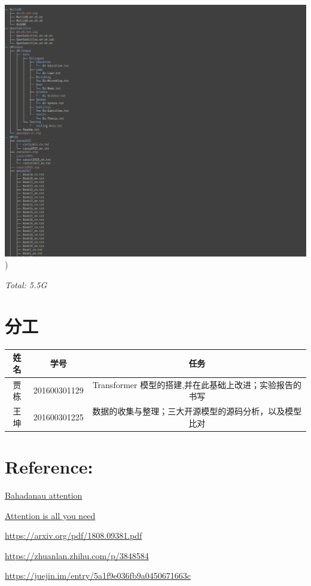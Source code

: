 \documentclass[UTF8,a4paper,10pt]{ctexart}
\begin{document}
\centerline{\includegraphics[scale=0.5]{pics/corpus.png})}
\textit{Total: 5.5G}

\section{分工}
\begin{tabular}{ccc}
\hline
姓名& 学号& 任务\\
\hline
贾栋&201600301129 &Transformer 模型的搭建,并在此基础上改进；实验报告的书写\\
王坤&201600301225 &数据的收集与整理；三大开源模型的源码分析，以及模型比对\\
\hline
\end{tabular}

\section{Reference:}

\href{https://arxiv.org/pdf/1409.0473.pdf}{\color{blue}Bahadanau attention}

\href{https://arxiv.org/pdf/1706.03762.pdf}{\color{blue}Attention is all you need}

\href{https://arxiv.org/pdf/1808.09381.pdf}{\color{blue}https://arxiv.org/pdf/1808.09381.pdf}

\href{https://zhuanlan.zhihu.com/p/38485843}{\color{blue}https://zhuanlan.zhihu.com/p/3848584}

\href{https://juejin.im/entry/5a1f9e036fb9a0450671663c}{\color{blue}https://juejin.im/entry/5a1f9e036fb9a0450671663c}

 


\end{document}

